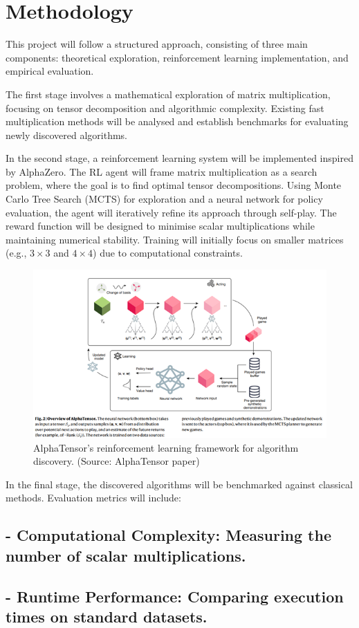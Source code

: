 \documentclass{article}
\begin{document}
\section{Methodology}
This project will follow a structured approach, consisting of three main components: theoretical exploration, reinforcement learning implementation, and empirical evaluation.  

The first stage involves a mathematical exploration of matrix multiplication, focusing on tensor decomposition and algorithmic complexity. Existing fast multiplication methods will be analysed and establish benchmarks for evaluating newly discovered algorithms.  

In the second stage, a reinforcement learning system will be implemented inspired by AlphaZero. The RL agent will frame matrix multiplication as a search problem, where the goal is to find optimal tensor decompositions. Using Monte Carlo Tree Search (MCTS) for exploration and a neural network for policy evaluation, the agent will iteratively refine its approach through self-play. The reward function will be designed to minimise scalar multiplications while maintaining numerical stability. Training will initially focus on smaller matrices (e.g., \( 3 \times 3 \) and \( 4 \times 4 \)) due to computational constraints.  

\begin{figure}[H]
    \centering
    \includegraphics[width=0.6\linewidth]{Picture2.png}
    \caption{AlphaTensor's reinforcement learning framework for algorithm discovery. (Source: AlphaTensor paper)}
    \label{fig:alphatensor-framework}
\end{figure}

In the final stage, the discovered algorithms will be benchmarked against classical methods. Evaluation metrics will include:  
\subsection{- Computational Complexity: Measuring the number of scalar multiplications.}
\subsection{- Runtime Performance: Comparing execution times on standard datasets.}  
\end{document}
